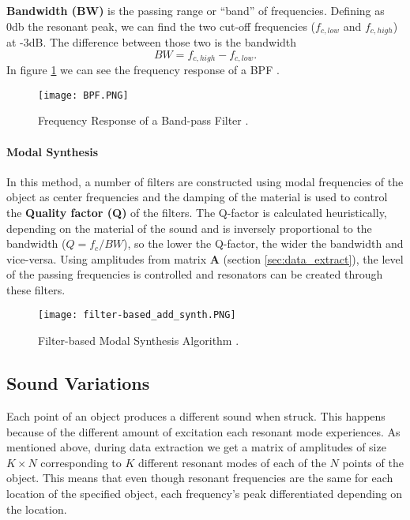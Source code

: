 \textbf{Bandwidth (BW)} is the passing range or ``band'' of frequencies. Defining as 0db the resonant peak, we can find the two cut-off frequencies ($f_{c,low}$ and $f_{c,high}$) at -3dB. The difference between those two is the bandwidth  
\begin{equation}\label{eq:bw}
BW = f_{c,high}-f_{c,low}.
\end{equation}   
In figure \ref{fig:resp_bpf} we can see the frequency response of a BPF \cite{bib:bpf}. 

\begin{figure}[H]
  \centering
    \texttt{[image: BPF.PNG]}
      \caption{Frequency Response of a Band-pass Filter  \cite{bib:bpf}.}
      \label{fig:resp_bpf}
\end{figure}

\paragraph{Modal Synthesis\\}\label{par:synth}

In this method, a number of filters are constructed using modal frequencies of the object as center frequencies and the damping of the material is used to control the \textbf{Quality factor (Q)} of the filters.  The Q-factor is calculated heuristically, depending on the material of the sound and is inversely proportional to the bandwidth ($Q=f_c/BW$), so the lower the Q-factor, the wider the bandwidth and vice-versa. Using amplitudes from matrix \textbf{A} (section \ref{sec:data_extract}), the level of the passing frequencies is controlled and resonators can be created through these filters. 

\begin{figure}[H]
  \centering
    \texttt{[image: filter-based\_add\_synth.PNG]}
      \caption{Filter-based Modal Synthesis Algorithm \cite{Cook:2002:RSS:515316}.}
      \label{fig:filter_synth}
\end{figure}

\subsection{Sound Variations} \label{sec:sound_variation}
Each point of an object produces a different sound when struck. This happens because of the different amount of excitation each resonant mode experiences. As mentioned above, during data extraction we get a matrix of amplitudes of size $K\times N$ corresponding to $K$ different resonant modes of each of the $N$ points of the object. This means that even though resonant frequencies are the same for each location of the specified object, each frequency's peak differentiated depending on the location.


